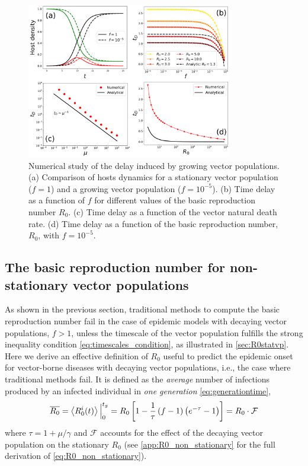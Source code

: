 \begin{figure}[H]
    \centering
    \includegraphics[width=0.8\textwidth]{Figures/delay.pdf}
    \caption[Numerical study of the delay induced by growing vector
    populations]{Numerical study of the delay induced by growing vector
    populations. (a) Comparison of hosts dynamics for a stationary vector
    population ($f=1$) and a growing vector population ($f=10^{-5}$). (b) Time
    delay as a function of $f$ for different values of the basic reproduction
    number $R_0$. (c) Time delay as a function of the vector natural death
    rate. (d) Time delay as a function of the basic reproduction number, $R_0$,
    with $f=10^{-5}$.}
    \label{fig:delay}
\end{figure}

\subsection{The basic reproduction number for non-stationary vector
    populations}

As shown in the previous section, traditional methods to compute the basic
reproduction number fail in the case of epidemic models with decaying vector
populations, $f>1$, unless the timescale of the vector population fulfills the
strong inequality condition \cref{eq:timescales_condition}, as illustrated in
\cref{sec:R0statvp}. Here we derive an effective definition of $R_0$ useful to
predict the epidemic onset for vector-borne diseases with decaying vector
populations, i.e., the case where traditional methods fail. It is defined as
the \textit{average} number of infections produced by an infected
individual in \textit{one generation} \cref{eq:generationtime},
\begin{equation}\label{eq:R0_non_stationary}
    \overline{R_0}=\left<R_{0}^{i}(t)\right>\Big\rvert_{0}^{t_g}=
    R_0\left[1-\frac{1}{\tau}\left(f-1\right)
        \left(e^{-\tau}-1\right)\right]=R_0\cdot\mathcal{F}
\end{equation}
where $\tau=1+\mu/\gamma$ and $\mathcal{F}$ accounts for the effect of the
decaying vector population on the stationary $R_0$ (see
\cref{app:R0_non_stationary} for the full derivation of
\cref{eq:R0_non_stationary}).

